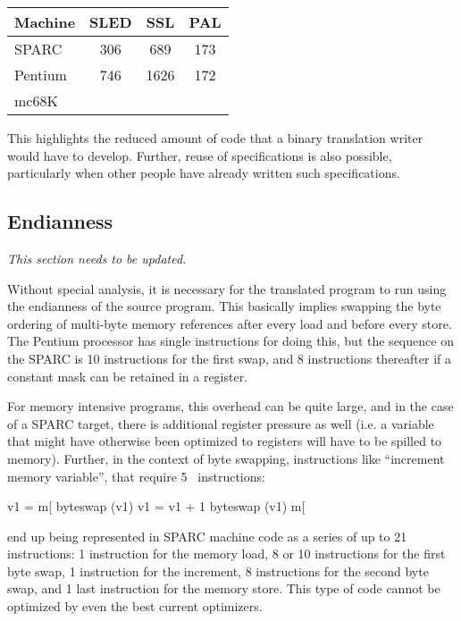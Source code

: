 \centerfigbegin
\begin{tabular}{|l|c|c|c|} \hline
Machine & SLED & SSL & PAL \\ \hline
SPARC & 306 & 689 & 173 \\
Pentium & 746 & 1626 & 172 \\
mc68K & & & \\ \hline
\end{tabular}

This highlights the reduced amount of code that a binary 
translation writer would have to develop.  Further, reuse of
specifications is also possible, particularly when other 
people have already written such specifications.


\subsection{Endianness}
\emph{This section needs to be updated.} 

Without special analysis, it is necessary for the translated program to run
using the endianness of the source program. This basically implies swapping the
byte ordering of multi-byte memory references after every load and before every
store. The Pentium processor has single instructions for doing this, but the
sequence on the SPARC is 10 instructions for the first swap, and 8 instructions
thereafter if a constant mask can be retained in a register.

For memory intensive programs, this overhead can be quite large, and in the
case of a SPARC target, there is additional register pressure as well
(i.e. a variable that might have otherwise been optimized to registers
will have to be spilled to memory).  Further, in the context of
byte swapping, instructions like ``increment memory variable'', that
require 5 \hrtl\ instructions:

\begin{smallverbatim}
  v1 = m[%
  byteswap (v1)
  v1 = v1 + 1
  byteswap (v1)
  m[%
\end{smallverbatim}

end up being represented in SPARC machine code as a series of up to 21
instructions: 1 instruction for the memory load, 8 or 10 instructions for the
first byte swap, 1 instruction for the increment, 8 instructions for the
second byte swap, and 1 last instruction for the memory store.
This type of code cannot be optimized by even the best current
optimizers.

